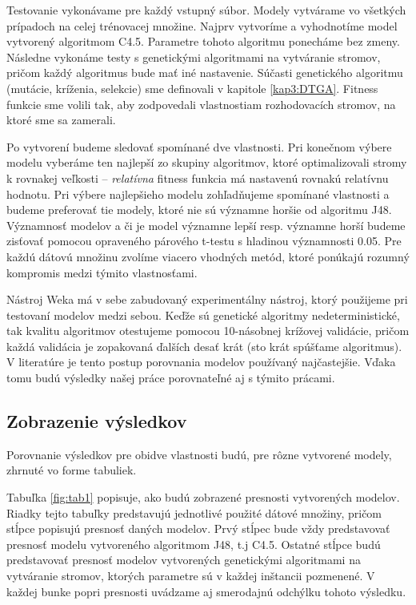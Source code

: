 Testovanie vykonávame pre každý vstupný súbor. Modely vytvárame vo všetkých prípadoch na celej trénovacej množine. Najprv vytvoríme a vyhodnotíme model vytvorený algoritmom C4.5. Parametre tohoto algoritmu ponecháme bez zmeny. Následne vykonáme testy s genetickými algoritmami na vytváranie stromov, pričom každý algoritmus bude mať iné nastavenie. Súčasti genetického algoritmu (mutácie, kríženia, selekcie) sme definovali v kapitole \ref{kap3:DTGA}. Fitness funkcie sme volili tak, aby zodpovedali vlastnostiam rozhodovacích stromov, na ktoré sme sa zamerali.

Po vytvorení budeme sledovať spomínané dve vlastnosti. Pri konečnom výbere modelu vyberáme ten najlepší zo skupiny algoritmov, ktoré optimalizovali stromy k rovnakej veľkosti -- \emph{relatívna} fitness funkcia má nastavenú rovnakú relatívnu hodnotu. Pri výbere najlepšieho modelu zohľadňujeme spomínané vlastnosti a budeme preferovať tie modely, ktoré nie sú významne horšie od algoritmu J48. Významnosť modelov a či je model významne lepší resp. významne horší budeme zisťovať pomocou opraveného párového t-testu s hladinou významnosti 0.05. Pre každú dátovú množinu zvolíme viacero vhodných metód, ktoré ponúkajú rozumný kompromis medzi týmito vlastnosťami.

Nástroj Weka má v sebe zabudovaný experimentálny nástroj, ktorý použijeme pri testovaní modelov medzi sebou. Keďže sú genetické algoritmy nedeterministické, tak kvalitu algoritmov otestujeme pomocou 10-násobnej krížovej validácie, pričom každá validácia je zopakovaná ďalších desať krát (sto krát spúšťame algoritmus). V literatúre je tento postup porovnania modelov používaný najčastejšie. Vďaka tomu budú výsledky našej práce porovnateľné aj s týmito prácami.

\subsection{Zobrazenie výsledkov}
Porovnanie výsledkov pre obidve vlastnosti budú, pre rôzne vytvorené modely, zhrnuté vo forme tabuliek.

Tabuľka \ref{fig:tab1} popisuje, ako budú zobrazené presnosti vytvorených modelov. Riadky tejto tabuľky predstavujú jednotlivé použité dátové množiny, pričom stĺpce popisujú presnosť daných modelov. Prvý stĺpec bude vždy predstavovať presnosť modelu vytvoreného algoritmom J48, t.j C4.5. Ostatné stĺpce budú predstavovať presnosť modelov vytvorených genetickými algoritmami na vytváranie stromov, ktorých parametre sú v každej inštancii pozmenené. V každej bunke popri presnosti uvádzame  aj smerodajnú odchýlku tohoto výsledku.

